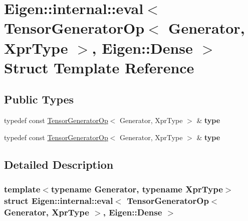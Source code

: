 \hypertarget{struct_eigen_1_1internal_1_1eval_3_01_tensor_generator_op_3_01_generator_00_01_xpr_type_01_4_00_01_eigen_1_1_dense_01_4}{}\section{Eigen\+:\+:internal\+:\+:eval$<$ Tensor\+Generator\+Op$<$ Generator, Xpr\+Type $>$, Eigen\+:\+:Dense $>$ Struct Template Reference}
\label{struct_eigen_1_1internal_1_1eval_3_01_tensor_generator_op_3_01_generator_00_01_xpr_type_01_4_00_01_eigen_1_1_dense_01_4}
\subsection*{Public Types}
\begin{DoxyCompactItemize}
\item 
\mbox{\label{struct_eigen_1_1internal_1_1eval_3_01_tensor_generator_op_3_01_generator_00_01_xpr_type_01_4_00_01_eigen_1_1_dense_01_4_a78dbd72cd7b629ac65a2355b31233fba}} 
typedef const \hyperlink{class_eigen_1_1_tensor_generator_op}{Tensor\+Generator\+Op}$<$ Generator, Xpr\+Type $>$ \& {\bfseries type}
\item 
\mbox{\label{struct_eigen_1_1internal_1_1eval_3_01_tensor_generator_op_3_01_generator_00_01_xpr_type_01_4_00_01_eigen_1_1_dense_01_4_a78dbd72cd7b629ac65a2355b31233fba}} 
typedef const \hyperlink{class_eigen_1_1_tensor_generator_op}{Tensor\+Generator\+Op}$<$ Generator, Xpr\+Type $>$ \& {\bfseries type}
\end{DoxyCompactItemize}


\subsection{Detailed Description}
\subsubsection*{template$<$typename Generator, typename Xpr\+Type$>$\newline
struct Eigen\+::internal\+::eval$<$ Tensor\+Generator\+Op$<$ Generator, Xpr\+Type $>$, Eigen\+::\+Dense $>$}



